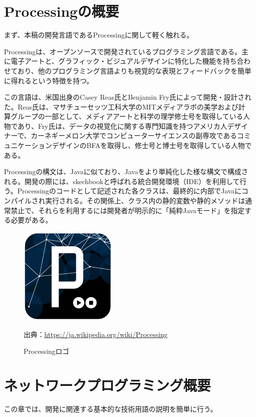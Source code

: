 \documentclass[dvipdfmx]{jsarticle}
\begin{document}
\section{Processingの概要}
まず、本稿の開発言語であるProcessingに関して軽く触れる。\par
Processingは、オープンソースで開発されているプログラミング言語である。主に電子アートと、グラフィック・ビジュアルデザインに特化した機能を持ち合わせており、他のプログラミング言語よりも視覚的な表現とフィードバックを簡単に得れるという特徴を持つ。\par
この言語は、米国出身のCasey Reas氏とBenjamin Fry氏によって開発・設計された。Reas氏は、マサチューセッツ工科大学のMITメディアラボの美学および計算グループの一部として、メディアアートと科学の理学修士号を取得している人物であり、Fry氏は、データの視覚化に関する専門知識を持つアメリカ人デザイナーで、カーネギーメロン大学でコンピューターサイエンスの副専攻であるコミュニケーションデザインのBFAを取得し、修士号と博士号を取得している人物である。\par
Processingの構文は、Javaに似ており、Javaをより単純化した様な構文で構成される。開発の際には、skechbookと呼ばれる統合開発環境（IDE）を利用して行う。Processingのコードとして記述された各クラスは、最終的に内部でJavaにコンパイルされ実行される。その関係上、クラス内の静的変数や静的メソッドは通常禁止で、それらを利用するには開発者が明示的に「純粋Javaモード」を指定する必要がある。\par
\begin{figure}[H]
  \centering
  \includegraphics[scale=0.4]{images/180px-Processing_Logo_Clipped.svg.png}
  \caption{Processingロゴ}
  出典：\url{https://ja.wikipedia.org/wiki/Processing}
\end{figure}
\section{ネットワークプログラミング概要}
この章では、開発に関連する基本的な技術用語の説明を簡単に行う。
\end{document}
